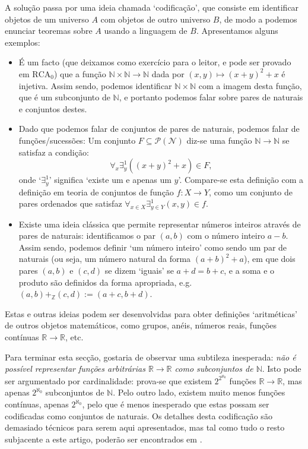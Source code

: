 A solução passa por uma ideia chamada `codificação', que consiste em identificar objetos de um universo $A$ com objetos de outro universo $B$, de modo a podemos enunciar teoremas sobre $A$ usando a linguagem de $B$. Apresentamos alguns exemplos:
\begin{itemize}
\item É um facto (que deixamos como exercício para o leitor, e pode ser provado em $\mathrm{RCA}_0$) que a função $\mathbb{N} \times \mathbb{N} \to \mathbb{N}$ dada por $(x,y) \mapsto (x+y)^2 + x$ é injetiva. Assim sendo, podemos identificar $\mathbb{N} \times \mathbb{N}$ com a imagem desta função, que é um subconjunto de $\mathbb{N}$, e portanto podemos falar sobre pares de naturais e conjuntos destes.

\item Dado que podemos falar de conjuntos de pares de naturais, podemos falar de funções/sucessões: Um conjunto $F \subseteq \mathcal{P}(\mathcal{N})$ diz-se uma função $\mathbb{N} \to \mathbb{N}$ se satisfaz a condição:
\begin{equation}
\forall_x \exists^1_y ((x+y)^2 + x) \in F,
\end{equation}
onde `$\exists^1_y$' significa `existe um e apenas um $y$'. Compare-se esta definição com a definição em teoria de conjuntos de função $f \colon X \to Y$, como um conjunto de pares ordenados que satisfaz $\forall_{x \in X} \exists^1_{y \in Y} (x,y) \in f$.

\item Existe uma ideia clássica que permite representar números inteiros através de pares de naturais: identificamos o par $(a,b)$ com o número inteiro $a-b$. Assim sendo, podemos definir `um número inteiro' como sendo um par de naturais (ou seja, um número natural da forma $(a+b)^2 + a$), em que dois pares $(a,b)$ e $(c,d)$ se dizem `iguais' se $a+d = b+c$, e a soma e o produto são definidos da forma apropriada, e.g. $(a,b) +_{\mathbb{Z}} (c,d) := (a+c,b+d)$.
\end{itemize}

Estas e outras ideias podem ser desenvolvidas para obter definições `aritméticas' de outros objetos matemáticos, como grupos, anéis, números reais, funções contínuas $\mathbb{R} \to \mathbb{R}$, etc.

Para terminar esta secção, gostaria de observar uma subtileza inesperada: \emph{não é possível representar funções arbitrárias $\mathbb{R} \to \mathbb{R}$ como subconjuntos de $\mathbb{N}$}. Isto pode ser argumentado por cardinalidade: prova-se que existem $2^{2^{\aleph_0}}$ funções $\mathbb{R} \to \mathbb{R}$, mas apenas $2^{\aleph_0}$ subconjuntos de $\mathbb{N}$. Pelo outro lado, existem muito menos funções contínuas, apenas $2^{\aleph_0}$, pelo que é menos inesperado que estas possam ser codificadas como conjuntos de naturais. Os detalhes desta codificação são demasiado técnicos para serem aqui apresentados, mas tal como tudo o resto subjacente a este artigo, poderão ser encontrados em \cite{simpson}.

